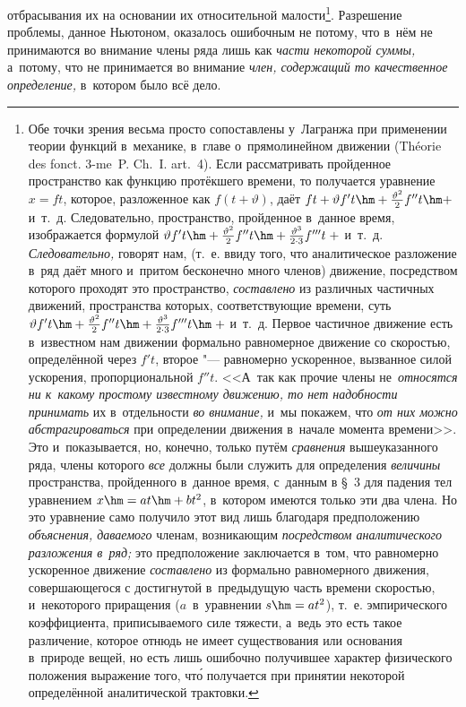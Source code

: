 отбрасывания их на основании их относительной малости\footnote{Обе точки зрения
весьма просто сопоставлены у~Лагранжа при применении теории функций в~механике,
в~главе о~прямолинейном движении (Théorie des fonct. 3-me~P. Ch.~I. art.~4).
Если рассматривать пройденное пространство как функцию протёкшего времени, то
получается уравнение $x=ft$, которое, разложенное как $f(t+\vartheta)$, даёт
$ft+\vartheta f't\hm+\frac{\vartheta^2}2f''t\hm+$ и~т.~д. Следовательно,
пространство, пройденное в~данное время, изображается формулой
$\vartheta f't\hm+\frac{\vartheta^2}2f''t\hm+
\frac{\vartheta^3}{2\cdot 3}f'''t\;+$ и~т.~д. {\em Следовательно,} говорят нам,
(т.~е. ввиду того, что аналитическое разложение в~ряд даёт много и~притом
бесконечно много членов) движение, посредством которого проходят это
пространство, {\em составлено} из различных частичных движений, пространства
которых, соответствующие времени, суть
$\vartheta f't\hm+\frac{\vartheta^2}2f''t\hm+
\frac{\vartheta^3}{2\cdot 3}f'''t\hm\;+$ и~т.~д. Первое частичное движение
есть в~известном нам движении формально равномерное движение со скоростью,
определённой через
$f't$, второе "--- равномерно ускоренное, вызванное силой ускорения,
пропорциональной $f''t$. <<А~так как прочие члены не~{\em относятся ни к~какому
простому известному движению, то нет надобности принимать} их в~отдельности
{\em во внимание,} и~мы покажем, что {\em от них можно абстрагироваться} при
определении движения в~начале момента времени>>. Это и~показывается, но,
конечно, только путём {\em сравнения} вышеуказанного ряда, члены которого
{\em все} должны были служить для определения {\em величины} пространства,
пройденного в~данное время, с~данным в \S~3 для падения тел уравнением
$x\hm=at\hm+bt^2$, в~котором имеются только эти два члена. Но это уравнение
само получило этот вид лишь благодаря предположению {\em объяснения, даваемого}
членам, возникающим {\em посредством аналитического разложения в~ряд;} это
предположение заключается в~том, что равномерно ускоренное движение
{\em составлено} из формально равномерного движения, совершающегося
с достигнутой в~предыдущую часть времени скоростью, и~некоторого приращения
($a$~в~уравнении $s\hm=at^2$), т.~е. эмпирического коэффициента, приписываемого
силе тяжести, а~ведь это есть такое различение, которое отнюдь не имеет
существования или основания в~природе вещей, но есть лишь ошибочно получившее
характер физического положения выражение того, чт\'{о} получается при принятии
некоторой определённой аналитической трактовки.}. Разрешение проблемы, данное
Ньютоном, оказалось ошибочным не потому, что в~нём не принимаются во внимание
члены ряда лишь как {\em части некоторой суммы,} а~потому, что не принимается
во внимание {\em член, содержащий то качественное определение,} в~котором было
всё дело.

